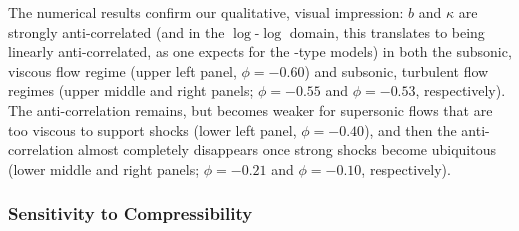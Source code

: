 \documentclass[12pt,twoside]{extreport}
\begin{document}
The numerical results confirm our qualitative, visual impression: $b$ and $\kappa$ are strongly anti-correlated (and in the $\log$-$\log$ domain, this translates to being linearly anti-correlated, as one expects for the \citealt{schekochihin2004simulations}-type models) in both the subsonic, viscous flow regime (upper left panel, $\phi = -0.60$) and subsonic, turbulent flow regimes (upper middle and right panels; $\phi = -0.55$ and $\phi = -0.53$, respectively). The anti-correlation remains, but becomes weaker for supersonic flows that are too viscous to support shocks (lower left panel, $\phi = -0.40$), and then the anti-correlation almost completely disappears once strong shocks become ubiquitous (lower middle and right panels; $\phi = -0.21$ and $\phi = -0.10$, respectively).

\subsubsection{Sensitivity to Compressibility}
\end{document}
